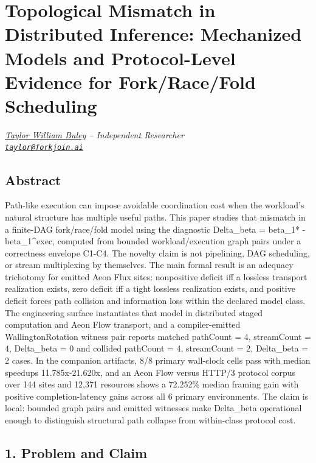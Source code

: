 \documentclass[
  11pt,
]{article}
\author{}
\date{}
\begin{document}
\section{Topological Mismatch in Distributed Inference: Mechanized
Models and Protocol-Level Evidence for Fork/Race/Fold
Scheduling}\label{topological-mismatch-in-distributed-inference-mechanized-models-and-protocol-level-evidence-for-forkracefold-scheduling}

\emph{\href{https://www.patreon.com/cw/twbuley}{Taylor William Buley} --
Independent Researcher}\\
\emph{\href{mailto:taylor@forkjoin.ai}{\nolinkurl{taylor@forkjoin.ai}}}

\subsection{Abstract}\label{abstract}

Path-like execution can impose avoidable coordination cost when the
workload's natural structure has multiple useful paths. This paper
studies that mismatch in a finite-DAG fork/race/fold model using the
diagnostic Delta\_beta = beta\_1* - beta\_1\^{}exec, computed from
bounded workload/execution graph pairs under a correctness envelope
C1-C4. The novelty claim is not pipelining, DAG scheduling, or stream
multiplexing by themselves. The main formal result is an adequacy
trichotomy for emitted Aeon Flux sites: nonpositive deficit iff a
lossless transport realization exists, zero deficit iff a tight lossless
realization exists, and positive deficit forces path collision and
information loss within the declared model class. The engineering
surface instantiates that model in distributed staged computation and
Aeon Flow transport, and a compiler-emitted WallingtonRotation witness
pair reports matched pathCount = 4, streamCount = 4, Delta\_beta = 0 and
collided pathCount = 4, streamCount = 2, Delta\_beta = 2 cases. In the
companion artifacts, 8/8 primary wall-clock cells pass with median
speedups 11.785x-21.620x, and an Aeon Flow versus HTTP/3 protocol corpus
over 144 sites and 12,371 resources shows a 72.252\% median framing gain
with positive completion-latency gains across all 6 primary
environments. The claim is local: bounded graph pairs and emitted
witnesses make Delta\_beta operational enough to distinguish structural
path collapse from within-class protocol cost.

\subsection{1. Problem and Claim}\label{problem-and-claim}
\end{document}
